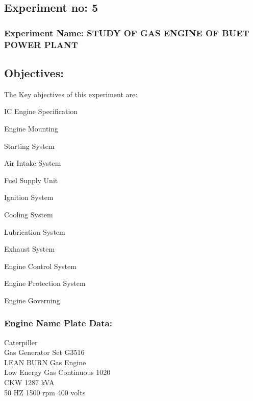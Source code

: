 \documentclass[12pt]{article}
\begin{document}
  \subsection*{Experiment no: 5}
  \subsubsection*{Experiment Name: STUDY OF GAS ENGINE OF BUET POWER PLANT} 
  \vspace*{0.3cm}
  \subsection*{Objectives:}
  The Key objectives of this experiment are:
  \begin{enumerate}[label=(\roman*)]
    \begin{multicols}{2}
      \item IC Engine Specification
      \item Engine Mounting 
      \item Starting System
      \item Air Intake System 
      \item Fuel Supply Unit 
      \item Ignition System
      \item Cooling System
      \item Lubrication System
      \item Exhaust System
      \item Engine Control System
      \item Engine Protection System 
      \item Engine Governing 
    \end{multicols}
    \end{enumerate}

    \subsubsection*{Engine Name Plate Data:}
      Caterpiller \\
      Gas Generator Set G3516 \\
      LEAN BURN Gas Engine \\
      Low Energy Gas Continuous 1020 \\ 
      CKW 1287 kVA \\
      50 HZ 1500 rpm 400 volts \\
\end{document}
